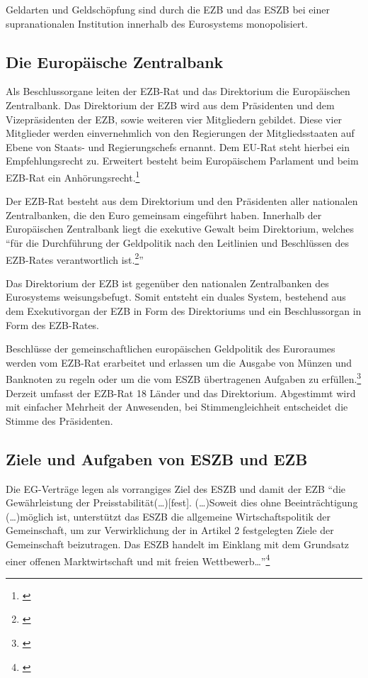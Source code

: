 \documentclass[
        onecolumn,
        a4paper,
        abstracton,
        parskip=half
        ,final
        ]{scrartcl}
\begin{document}
Geldarten und Geldsch{\"o}pfung sind durch die EZB und das ESZB bei einer supranationalen Institution innerhalb des Eurosystems monopolisiert.

\subsection{Die Europ{\"a}ische Zentralbank}
Als Beschlussorgane leiten der EZB-Rat und das Direktorium die Europ{\"a}ischen Zentralbank. Das Direktorium der \ac{EZB} wird aus dem Pr{\"a}sidenten und dem Vizepr{\"a}sidenten der EZB, sowie weiteren vier Mitgliedern gebildet. Diese vier Mitglieder werden einvernehmlich von den Regierungen der Mitgliedsstaaten auf Ebene von Staats- und Regierungschefs ernannt. Dem EU-Rat steht hierbei ein Empfehlungsrecht zu. Erweitert besteht beim Europ{\"a}ischem Parlament und beim EZB-Rat ein Anh{\"o}rungsrecht.\footnote[46]{\citep*[vgl.][S.553]{Basseler2010}}

Der EZB-Rat besteht aus dem Direktorium und den Pr{\"a}sidenten aller nationalen Zentralbanken, die den Euro gemeinsam eingef{\"u}hrt haben. Innerhalb der Europ{\"a}ischen Zentralbank liegt die exekutive Gewalt beim Direktorium, welches "`f{\"u}r die Durchf{\"u}hrung der Geldpolitik nach den Leitlinien und Beschl{\"u}ssen des EZB-Rates verantwortlich ist.\footnote[47]{\citep*[S.553]{Basseler2010}}"'

Das Direktorium der \ac{EZB} ist gegen{\"u}ber den nationalen Zentralbanken des Eurosystems weisungsbefugt. Somit entsteht ein duales System, bestehend aus dem Exekutivorgan der EZB in Form des Direktoriums und ein Beschlussorgan in Form des EZB-Rates.

Beschl{\"u}sse der gemeinschaftlichen europ{\"a}ischen Geldpolitik des Euroraumes werden vom EZB-Rat erarbeitet und erlassen um die Ausgabe von M{\"u}nzen und Banknoten zu regeln oder um die vom \ac{ESZB} {\"u}bertragenen Aufgaben zu erf{\"u}llen.\footnote[100]{\citep*[vgl.][S.553]{Basseler2010}}
Derzeit umfasst der EZB-Rat 18 L{\"a}nder und das Direktorium. Abgestimmt wird mit einfacher Mehrheit der Anwesenden, bei Stimmengleichheit entscheidet die Stimme des Pr{\"a}sidenten.


\subsection{Ziele und Aufgaben von ESZB und EZB}  %
Die EG-Vertr{\"a}ge legen als vorrangiges Ziel des \ac{ESZB} und damit der EZB "`die Gew{\"a}hrleistung der Preisstabilit{\"a}t(\ldots)[fest]. (\ldots)Soweit dies ohne Beeintr{\"a}chtigung (\ldots)m{\"o}glich ist, unterst{\"u}tzt das ESZB die allgemeine Wirtschaftspolitik der Gemeinschaft, um zur Verwirklichung der in Artikel 2 festgelegten Ziele der Gemeinschaft beizutragen. Das ESZB handelt im Einklang mit dem Grundsatz einer offenen Marktwirtschaft und mit freien Wettbewerb\ldots"'\footnote[48]{\citep*[vgl.][S.554]{Basseler2010}}
\end{document}
